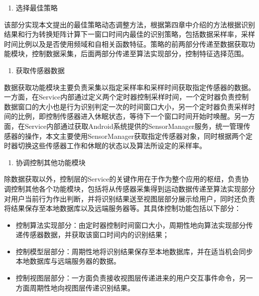 \begin{enumerate}[(1)]
	\item 选择最佳策略
\end{enumerate}
\par 该部分实现本文提出的最佳策略动态调整方法，根据第四章中介绍的方法根据识别结果和行为转换矩阵计算下一窗口时间内最佳的识别策略，包括数据采样率，采样时间比例以及是否使用频域和自相关函数特征。策略的前两部分传递至数据获取功能模块，控制数据采集，后面两部分传递至算法实现部分，控制特征选择范围。
\begin{enumerate}[(2)]
	\item 获取传感器数据
\end{enumerate}
\par 数据获取功能模块主要负责采集以指定采样率和采样时间获取指定传感器的数据。一方面，在Service内部通过定义两个定时器控制采样时间，一个定时器负责控制数据窗口的大小也是行为识别判定一次的时间窗口大小，另一个定时器负责采样时间的比例，即控制传感器进入休眠状态，等待下一个窗口时间开始时唤醒。另一方面，在Service内部通过获取Android系统提供的SensorManager服务，统一管理传感器的操作，本文主要使用SensorManager获取指定传感器对象，同时根据两个定时器切换这些传感器工作和休眠的状态以及算法所设定的采样率。
\begin{enumerate}[(3)]
	\item 协调控制其他功能模块
\end{enumerate}
\par 除数据获取以外，控制层的Service的关键作用在于作为整个应用的枢纽，负责协调控制其他各个功能模块，包括将从传感器采集得到运动数据传递至算法实现部分对用户当前行为作出判断，并将识别结果送至视图层部分展示给用户，同时还负责将结果保存至本地数据库以及远端服务器等。其具体控制功能包括以下部分：
\begin{itemize}
	\item 控制算法实现部分：由定时器控制时间窗口大小，周期性地向算法实现部分传递传感器数据，并获取该窗口时间内的识别结果；
	\item 控制模型层部分：周期性地将识别结果保存至本地数据库，并在适当机会同步本地数据库与远端服务器的数据。
	\item 控制视图层部分：一方面负责接收视图层传递进来的用户交互事件命令，另一方面周期性地向视图层传递识别结果。
\end{itemize}
